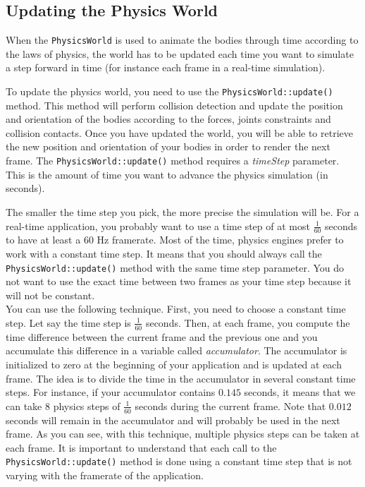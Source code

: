 \documentclass[a4paper,12pt]{article}
\begin{document}
    \subsection{Updating the Physics World}
    \label{sec:updatingphysicsworld} 

    When the \texttt{PhysicsWorld} is used to animate the bodies through time according to the laws of physics, the world has to be updated each time you
    want to simulate a step forward in time (for instance each frame in a real-time simulation). \\

   \begin{sloppypar}
    To update the physics world, you need to use the \texttt{PhysicsWorld::update()} method. This method will perform collision detection and update the
    position and orientation of the bodies according to the forces, joints constraints and collision contacts. Once you have updated the world, you will be
    able to retrieve the new position and orientation of your bodies in order to render the next frame. The \texttt{PhysicsWorld::update()} method
    requires a \emph{timeStep} parameter. This is the amount of time you want to advance the physics simulation (in seconds). \\
   \end{sloppypar}

    The smaller the time step you pick, the more precise the simulation will be. For a real-time application, you probably want to use a time step of
    at most $\frac{1}{60}$ seconds to have at least a 60 Hz framerate. Most of the time, physics engines prefer to work with a constant time step.
    It means that you should always call the \texttt{PhysicsWorld::update()} method with the same time step parameter. You do not want to use the exact time
    between two frames as your time step because it will not be constant. \\

    You can use the following technique. First, you need to choose a constant time step. Let say the time step is $\frac{1}{60}$ seconds.
    Then, at each frame, you compute the time difference between the current frame and the previous one and you accumulate this difference in a variable
    called \emph{accumulator}. The accumulator is initialized to zero at the beginning of your application and is updated at each frame. The idea is to
    divide the time in the accumulator in several constant time steps.  For instance, if your accumulator contains $0.145$ seconds, it means that
    we can take $8$ physics steps of $\frac{1}{60}$ seconds during the current frame. Note that $0.012$ seconds will remain in the accumulator
    and will probably be used in the next frame. As you can see, with this technique, multiple physics steps can be taken at each frame.
    It is important to understand that each call to the \texttt{PhysicsWorld::update()} method is done using a constant time step that is
    not varying with the framerate of the application. \\
\end{document}
